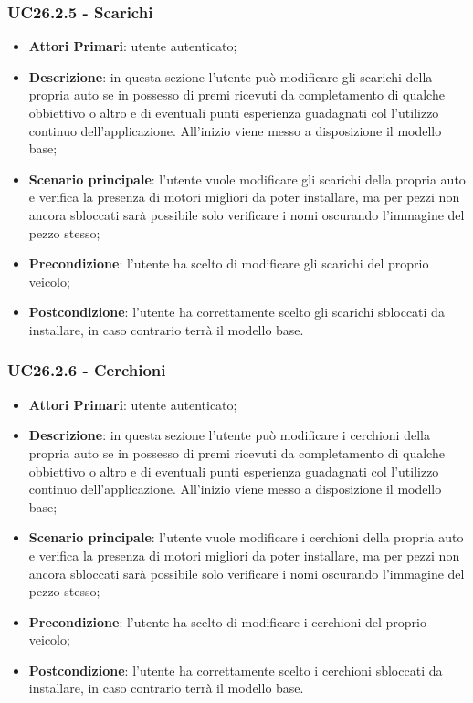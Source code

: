 \subsubsection{UC26.2.5 - Scarichi}
\begin{itemize}
	\item \textbf{Attori Primari}: utente autenticato;
	\item \textbf{Descrizione}: in questa sezione l'utente può modificare gli scarichi della propria auto se in possesso di premi ricevuti da completamento di qualche obbiettivo o altro e di eventuali punti esperienza guadagnati col l'utilizzo continuo dell'applicazione.
	All'inizio viene messo a disposizione il modello base;
	\item \textbf{Scenario principale}: l'utente vuole modificare gli scarichi della propria auto e verifica la presenza di motori migliori da poter installare, ma per pezzi non ancora sbloccati sarà possibile solo verificare i nomi oscurando l'immagine del pezzo stesso;
	\item \textbf{Precondizione}: l'utente ha scelto di modificare gli scarichi del proprio veicolo; 
	\item \textbf{Postcondizione}: l'utente ha correttamente scelto gli scarichi sbloccati da installare, in caso contrario terrà il modello base.
\end{itemize}
\subsubsection{UC26.2.6 - Cerchioni}
\begin{itemize}
	\item \textbf{Attori Primari}: utente autenticato;
	\item \textbf{Descrizione}: in questa sezione l'utente può modificare i cerchioni della propria auto se in possesso di premi ricevuti da completamento di qualche obbiettivo o altro e di eventuali punti esperienza guadagnati col l'utilizzo continuo dell'applicazione.
	All'inizio viene messo a disposizione il modello base;
	\item \textbf{Scenario principale}: l'utente vuole modificare i cerchioni della propria auto e verifica la presenza di motori migliori da poter installare, ma per pezzi non ancora sbloccati sarà possibile solo verificare i nomi oscurando l'immagine del pezzo stesso;
	\item \textbf{Precondizione}: l'utente ha scelto di modificare i cerchioni del proprio veicolo; 
	\item \textbf{Postcondizione}: l'utente ha correttamente scelto i cerchioni sbloccati da installare, in caso contrario terrà il modello base.
\end{itemize} 
